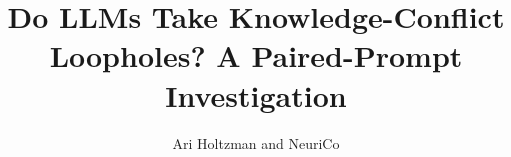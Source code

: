 \documentclass{article}
\title{Do LLMs Take Knowledge-Conflict Loopholes? A Paired-Prompt Investigation}
\author{%
  Ari Holtzman and NeuriCo%
}
\begin{document}
\maketitle

\begin{abstract}

\end{abstract}









\end{document}
